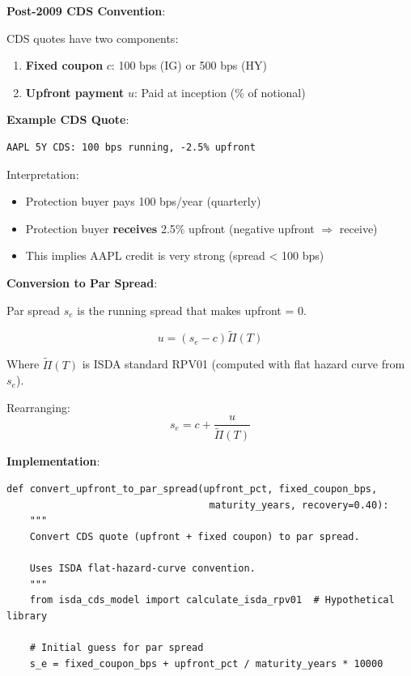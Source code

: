 \documentclass[11pt,a4paper]{article}
\begin{document}
\begin{implbox}
\textbf{Post-2009 CDS Convention}:

CDS quotes have two components:
\begin{enumerate}
    \item \textbf{Fixed coupon} $c$: 100 bps (IG) or 500 bps (HY)
    \item \textbf{Upfront payment} $u$: Paid at inception (\% of notional)
\end{enumerate}

\textbf{Example CDS Quote}:
\begin{verbatim}
AAPL 5Y CDS: 100 bps running, -2.5% upfront
\end{verbatim}

Interpretation:
\begin{itemize}
    \item Protection buyer pays 100 bps/year (quarterly)
    \item Protection buyer \textbf{receives} 2.5\% upfront (negative upfront $\Rightarrow$ receive)
    \item This implies AAPL credit is very strong (spread < 100 bps)
\end{itemize}

\textbf{Conversion to Par Spread}:

Par spread $s_e$ is the running spread that makes upfront = 0.

\begin{equation}
u = (s_e - c) \tilde{\Pi}(T)
\end{equation}

Where $\tilde{\Pi}(T)$ is ISDA standard RPV01 (computed with flat hazard curve from $s_e$).

Rearranging:
\begin{equation}
s_e = c + \frac{u}{\tilde{\Pi}(T)}
\end{equation}

\textbf{Implementation}:
\begin{lstlisting}
def convert_upfront_to_par_spread(upfront_pct, fixed_coupon_bps, 
                                   maturity_years, recovery=0.40):
    """
    Convert CDS quote (upfront + fixed coupon) to par spread.
    
    Uses ISDA flat-hazard-curve convention.
    """
    from isda_cds_model import calculate_isda_rpv01  # Hypothetical library
    
    # Initial guess for par spread
    s_e = fixed_coupon_bps + upfront_pct / maturity_years * 10000
    

\end{lstlisting}
\end{implbox}
\end{document}
